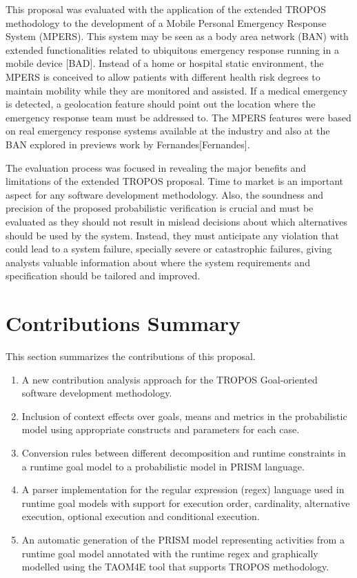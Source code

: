 This proposal was evaluated with the application of the extended TROPOS methodology to the development of a Mobile Personal Emergency Response System (MPERS). This system may be seen as a body area network (BAN) with extended functionalities related to ubiquitous emergency response running in a mobile device [BAD]. Instead of a home or hospital static environment, the MPERS is conceived to allow patients with different health risk degrees to maintain mobility while they are monitored and assisted. If a medical emergency is detected, a geolocation feature should point out the location where the emergency response team must be addressed to. The MPERS features were based on real emergency response systems available at the industry and also at the BAN explored in previews work by Fernandes[Fernandes].

The evaluation process was focused in revealing the major benefits and limitations of the extended TROPOS proposal. Time to market is an important aspect for any software development methodology. Also, the soundness and precision of the proposed probabilistic verification is crucial and must be evaluated as they should not result in mislead decisions about which alternatives should be used by the system. Instead, they must anticipate any violation that could lead to a system failure, specially severe or catastrophic failures, giving analysts valuable information about where the system requirements and specification should be tailored and improved.

\section{Contributions Summary}

This section summarizes the contributions of this proposal.


\begin{enumerate}

\item A new contribution analysis approach for the TROPOS Goal-oriented software development methodology.

\item Inclusion of context effects over goals, means and metrics in the probabilistic model using appropriate constructs and parameters for each case.

\item Conversion rules between different decomposition and runtime constraints in a runtime goal model to a probabilistic model in PRISM language.

\item A parser implementation for the regular expression (regex) language used in runtime goal models with support for execution order, cardinality, alternative execution, optional execution and conditional execution. 

\item An automatic generation of the PRISM model representing activities from a runtime goal model annotated with the runtime regex and graphically modelled using the TAOM4E tool that supports TROPOS methodology.

\end{enumerate}

